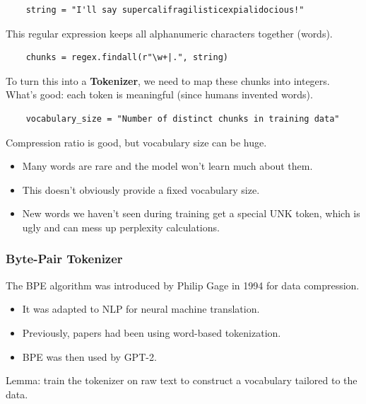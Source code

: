\documentclass[12pt,twoside]{article}
\begin{document}
\begin{verbatim}
    string = "I'll say supercalifragilisticexpialidocious!"
\end{verbatim}

This regular expression keeps all alphanumeric characters together (words).

\begin{verbatim}
    chunks = regex.findall(r"\w+|.", string)
\end{verbatim}

To turn this into a \textbf{Tokenizer}, we need to map these chunks into integers. \\

What's good: each token is meaningful (since humans invented words).

\begin{verbatim}
    vocabulary_size = "Number of distinct chunks in training data"
\end{verbatim}

Compression ratio is good, but vocabulary size can be huge.

\begin{itemize}
    \item Many words are rare and the model won't learn much about them.
    \item This doesn't obviously provide a fixed vocabulary size.
    \item New words we haven't seen during training get a special UNK token, which is ugly and can mess up perplexity calculations.
\end{itemize}

\subsubsection*{Byte-Pair Tokenizer}

The BPE algorithm was introduced by Philip Gage in 1994 for data compression.

\begin{itemize}
    \item It was adapted to NLP for neural machine translation.
    \item Previously, papers had been using word-based tokenization.
    \item BPE was then used by GPT-2.
\end{itemize}

Lemma: train the tokenizer on raw text to construct a vocabulary tailored to the data.
\end{document}
